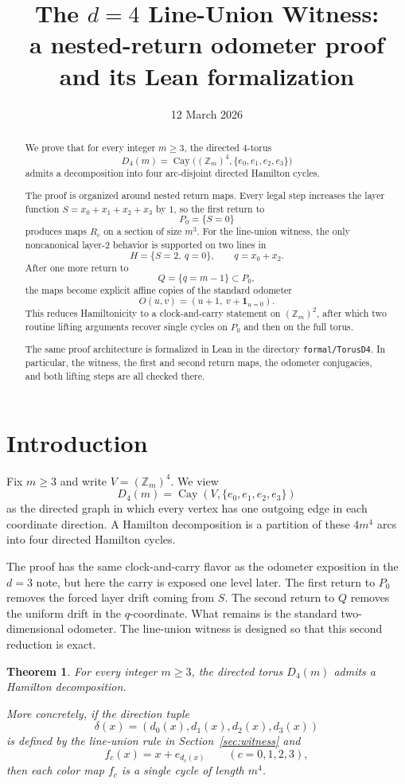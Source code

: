 \documentclass[11pt]{article}
\title{The $d=4$ Line-Union Witness:\\
a nested-return odometer proof and its Lean formalization}
\author{}
\date{12 March 2026}
\newtheorem{theorem}{Theorem}
\newcommand{\Zm}{\mathbb Z_m}
\newcommand{\I}{\mathbf 1}
\newcommand{\Pzero}{P_0}
\newcommand{\Qslice}{Q}
\begin{document}
\maketitle

\begin{abstract}
We prove that for every integer $m \ge 3$, the directed $4$-torus
\[
D_4(m)=\operatorname{Cay}\bigl((\Zm)^4,\{e_0,e_1,e_2,e_3\}\bigr)
\]
admits a decomposition into four arc-disjoint directed Hamilton cycles.

The proof is organized around nested return maps. Every legal step increases the
layer function $S=x_0+x_1+x_2+x_3$ by $1$, so the first return to
\[
\Pzero=\{S=0\}
\]
produces maps $R_c$ on a section of size $m^3$. For the line-union witness, the
only noncanonical layer-$2$ behavior is supported on two lines in
\[
H=\{S=2,\ q=0\}, \qquad q=x_0+x_2.
\]
After one more return to
\[
\Qslice=\{q=m-1\}\subset \Pzero,
\]
the maps become explicit affine copies of the standard odometer
\[
O(u,v)=(u+1,\ v+\I_{u=0}).
\]
This reduces Hamiltonicity to a clock-and-carry statement on $(\Zm)^2$, after
which two routine lifting arguments recover single cycles on $\Pzero$ and then on
the full torus.

The same proof architecture is formalized in Lean in the directory
\texttt{formal/TorusD4}. In particular, the witness, the first and second return
maps, the odometer conjugacies, and both lifting steps are all checked there.
\end{abstract}

\section{Introduction}

Fix $m \ge 3$ and write $V=(\Zm)^4$. We view
\[
D_4(m)=\operatorname{Cay}(V,\{e_0,e_1,e_2,e_3\})
\]
as the directed graph in which every vertex has one outgoing edge in each
coordinate direction. A Hamilton decomposition is a partition of these $4m^4$
arcs into four directed Hamilton cycles.

The proof has the same clock-and-carry flavor as the odometer exposition in the
$d=3$ note, but here the carry is exposed one level later. The first return to
$\Pzero$ removes the forced layer drift coming from $S$. The second return to
$\Qslice$ removes the uniform drift in the $q$-coordinate. What remains is the
standard two-dimensional odometer. The line-union witness is designed so that
this second reduction is exact.

\begin{theorem}\label{thm:main}
For every integer $m \ge 3$, the directed torus $D_4(m)$ admits a Hamilton
decomposition.

More concretely, if the direction tuple
\[
\delta(x)=(d_0(x),d_1(x),d_2(x),d_3(x))
\]
is defined by the line-union rule in Section~\ref{sec:witness} and
\[
f_c(x)=x+e_{d_c(x)} \qquad (c=0,1,2,3),
\]
then each color map $f_c$ is a single cycle of length $m^4$.
\end{theorem}
\end{document}

